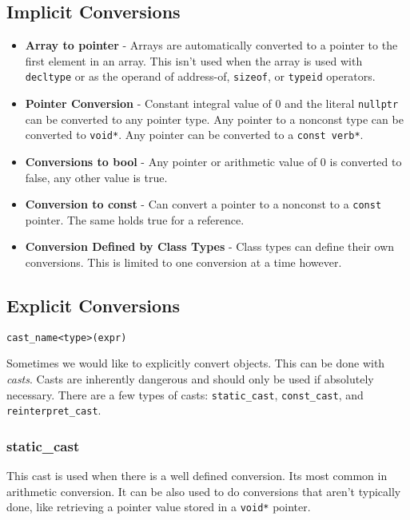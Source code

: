 \documentclass[12pt, a4paper]{report}
\begin{document}
\subsection{Implicit Conversions}
\begin{itemize}
  \item \textbf{Array to pointer} - Arrays are automatically converted to a pointer to the first element in an array.
    This isn't used when the array is used with \verb|decltype| or as the operand of address-of, \verb|sizeof|, or \verb|typeid| operators. \\
  \item \textbf{Pointer Conversion} - Constant integral value of 0 and the literal \verb|nullptr| can be converted to any pointer type.
    Any pointer to a nonconst type can be converted to \verb|void*|.
    Any pointer can be converted to a \verb|const verb*|. \\
  \item \textbf{Conversions to bool} - Any pointer or arithmetic value of 0 is converted to false, any other value is true. \\
  \item \textbf{Conversion to const} - Can convert a pointer to a nonconst to a \verb|const| pointer.
    The same holds true for a reference.
  \item \textbf{Conversion Defined by Class Types} - Class types can define their own conversions.
    This is limited to one conversion at a time however.
\end{itemize}

\subsection{Explicit Conversions}
\begin{center}
  \verb|cast_name<type>(expr)|
\end{center}
Sometimes we would like to explicitly convert objects.
This can be done with \emph{casts}.
Casts are inherently dangerous and should only be used if absolutely necessary.
There are a few types of casts: \verb|static_cast|, \verb|const_cast|, and \verb|reinterpret_cast|.
\subsubsection{static\_cast}
This cast is used when there is a well defined conversion.
Its most common in arithmetic conversion. 
It can be also used to do conversions that aren't typically done, like retrieving a pointer value stored in a \verb|void*| pointer.
\end{document}
